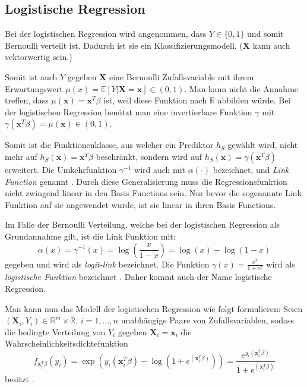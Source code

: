 \subsection{Logistische Regression}
Bei der logistischen Regression wird angenommen, dass $Y \in \{0,1\}$ und somit Bernoulli verteilt ist.
Dadurch ist sie ein Klassifizierungsmodell. ($\mathbf{X}$ kann auch vektorwertig sein.)

Somit ist auch $Y$ gegeben $\mathbf{X}$ eine Bernoulli Zufallsvariable mit ihrem Erwartungswert $\mu(x) = \mathbb{E}[Y|\mathbf{X} = \mathbf{x}] \in (0,1)$. Man kann nicht die Annahme treffen, dass
$\mu(\mathbf{x}) = \mathbf{x}^T\beta$ ist, weil diese Funktion nach $\mathbb{R}$ abbilden w\"urde. Bei der logistischen Regression ben\"utzt man eine invertierbare Funktion $\gamma$ mit
$\gamma(\mathbf{x}^T\beta) = \mu(\mathbf{x}) \in (0,1)$.

Somit ist die Funktionenklasse, aus welcher ein Prediktor $h_S$ gew\"ahlt wird, nicht mehr auf $h_S(\mathbf{x}) = \mathbf{x}^T\beta$ beschr\"ankt,
sondern wird auf  $h_S(\mathbf{x}) = \gamma(\mathbf{x}^T\beta)$ erweitert. Die Umkehrfunktion $\gamma^{-1}$ wird auch mit $\alpha(\cdot)$ bezeichnet,
und \textit{Link Function} genannt \cite[Seite 180]{bishop}. Durch diese Generalisierung muss die Regressionsfunktion nicht zwingend linear in den Basis Functions sein.
Nur bevor die sogenannte Link Funktion auf sie angewendet wurde, ist sie linear in ihren Basis Functions.

Im Falle der Bernoulli Verteilung, welche bei der logistischen Regression als Grundannahme gilt, ist die Link Funktion mit:
$$ \alpha(x) = \gamma^{-1}(x) = \log(\frac{x}{1-x}) = \log(x) - \log(1-x) $$
gegeben und wird als \textit{logit-link} bezeichnet. Die Funktion $\gamma(x) = \frac{e^x}{1 + e^x}$ wird als \textit{logistische Funktion} bezeichnet \cite[Seite 223]{wasserman}.
Daher kommt auch der Name \glqq logistische Regression\grqq{}.


Man kann nun das Modell der logistischen Regression wie folgt formulieren:
Seien $(\mathbf{X}_i, Y_i) \in \mathbb{R}^m \times \mathbb{R}$, $i = 1, \dots , n$  unabh\"angige Paare von Zufallsvariablen, sodass die bedingte Verteilung von
$Y_i$ gegeben $\mathbf{X}_i = \mathbf{x}_i$ die Wahrscheinlichkeitsdichtefunktion
$$ f_{\mathbf{x}_i^T\beta}(y_i) = \exp( y_i(\mathbf{x}_i^T\beta) - \log(1 + e^{(\mathbf{x}_i^T\beta)})) = \frac{e^{y_i(\mathbf{x}_i^T\beta)}}{1 + e^{(\mathbf{x}_i^T\beta)}}$$
besitzt \cite[Seite 223]{wasserman}. %

